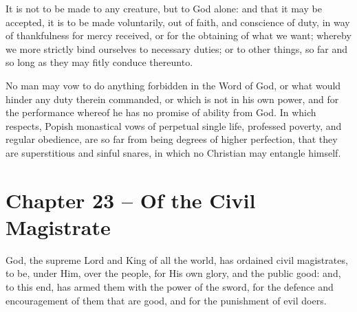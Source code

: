 \begin{outerlst}[left=0pt,labelsep=0pt]
\begin{innerlst}[resume*]
\item It is not to be made to any creature, but to God alone: and that it may be accepted, it is to be made voluntarily, out of faith, and conscience of duty, in way of thankfulness for mercy received, or for the obtaining of what we want; whereby we more strictly bind ourselves to necessary duties; or to other things, so far and so long as they may fitly conduce thereunto.   

\item No man may vow to do anything forbidden in the Word of God, or what would hinder any duty therein commanded, or which is not in his own power, and for the performance whereof he has no promise of ability from God. In which respects, Popish monastical vows of perpetual single life, professed poverty, and regular obedience, are so far from being degrees of higher perfection, that they are superstitious and sinful snares, in which no Christian may entangle himself.  
\end{innerlst}

\item
{}
\section{Chapter 23 -- Of the Civil Magistrate}
\begin{innerlst}[resume*]

\item God, the supreme Lord and King of all the world, has ordained civil magistrates, to be, under Him, over the people, for His own glory, and the public good: and, to this end, has armed them with the power of the sword, for the defence and encouragement of them that are good, and for the punishment of evil doers.   


\end{innerlst}
\end{outerlst}
